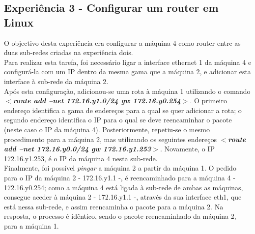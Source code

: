 \documentclass[a4paper]{article}
\begin{document}
\subsection{Experiência 3 - Configurar um router em Linux}
O objectivo desta experiência era configurar a máquina 4 como router entre as duas sub-redes criadas na experiência dois.\\
Para realizar esta tarefa, foi necessário ligar a interface ethernet 1 da máquina 4 e configurá-la com um IP dentro da mesma gama que a máquina 2, e adicionar esta interface à sub-rede da máquina 2.\\
Após esta configuração, adicionou-se uma rota à máquina 1 utilizando o comando \textbf{\textit{$<$route add –net  172.16.y1.0/24 gw 172.16.y0.254$>$}}. O primeiro endereço identifica a gama de endereços para a qual se quer adicionar a rota; o segundo endereço identifica o IP para o qual se deve reencaminhar o pacote (neste caso o IP da máquina 4). Posteriormente, repetiu-se o mesmo procedimento para a máquina 2, mas utilizando os seguintes endereços \textbf{\textit{$<$route add –net 172.16.y0.0/24 gw 172.16.y1.253$>$}}. Novamente, o IP 172.16.y1.253, é o IP da máquina 4 nesta sub-rede.\\
Finalmente, foi possível \emph{pingar} a máquina 2 a partir da máquina 1. O pedido para o IP da máquina 2 - 172.16.y1.1 -, é reencaminhado para a máquina 4 - 172.16.y0.254; como a máquina 4 está ligada à sub-rede de ambas as máquinas, consegue aceder à máquina 2 - 172.16.y1.1 -, através da sua interface eth1, que está nessa sub-rede, e assim reencaminha o pacote para a máquina 2. Na resposta, o processo é idêntico, sendo o pacote reencaminhado da máquina 2, para a máquina 1.
\end{document}
